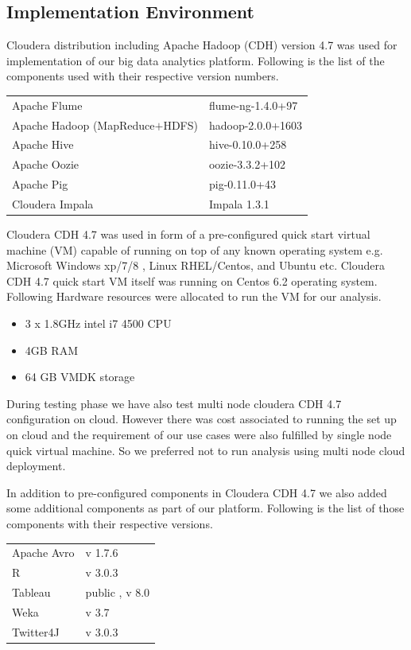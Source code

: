 \subsection{Implementation Environment} \label{env}
Cloudera distribution including Apache Hadoop (CDH) version 4.7 was used for implementation of our big data analytics platform. Following is the list of the components used with their respective version numbers.  
\begin{longtable}{@{}p{}p{}@{}}
Apache Flume & flume-ng-1.4.0+97 \\
Apache Hadoop (MapReduce\(+\)HDFS) & hadoop-2.0.0+1603 \\ 
Apache Hive & hive-0.10.0+258 \\ 
Apache Oozie  & oozie-3.3.2+102 \\
Apache Pig & pig-0.11.0+43 \\ 
Cloudera Impala & Impala 1.3.1 
\end{longtable}
Cloudera CDH 4.7 was used in form of a pre-configured quick start virtual machine (VM) capable of running on top of any known operating system e.g. Microsoft Windows xp/7/8 , Linux RHEL/Centos, and Ubuntu etc. Cloudera CDH 4.7 quick start VM itself was running on Centos 6.2 operating system. Following Hardware resources were allocated to run the VM for our analysis.
\begin{itemize}
\item 3 x 1.8GHz intel i7 4500 CPU
\item 4GB RAM 
\item 64 GB VMDK storage
\end{itemize}
During testing phase we have also test multi node cloudera CDH 4.7 configuration on cloud. However there was cost associated to running the set up on cloud and the requirement of our use cases were also fulfilled by single node quick virtual machine. So we preferred not to run analysis using multi node cloud deployment.

In addition to pre-configured components in Cloudera CDH 4.7 we also added some additional components as part of our platform. Following is the list of those components with their respective versions.
\begin{longtable}{@{}p{}p{}@{}}
Apache Avro & v 1.7.6 \\
R & v 3.0.3 \\ 
Tableau & public , v 8.0 \\ 
Weka  & v 3.7 \\
Twitter4J & v 3.0.3 
\end{longtable}

